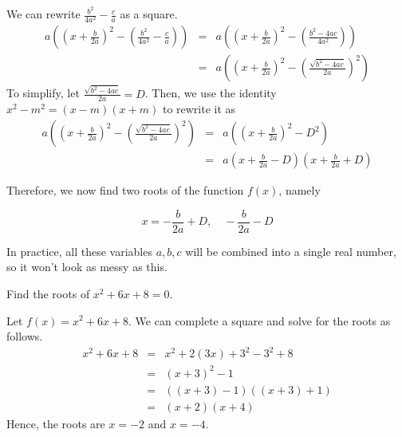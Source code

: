 \begin{frame}
We can rewrite $ \frac{b^2}{4a^2} - \frac{c}{a}$ as a square.
\begin{eqnarray*}
a\left( \left(x + \frac{b}{2a}\right)^2- \left( \frac{b^2}{4a^2} - \frac{c}{a}\right)  \right) &=&  a\left( \left(x + \frac{b}{2a}\right)^2- \left( \frac{b^2-4ac}{4a^2}\right)  \right) \\
&=& a\left( \left(x + \frac{b}{2a}\right)^2- \left( \frac{\sqrt{b^2-4ac}}{2a}\right)^2  \right)
\end{eqnarray*}
To simplify, let $\frac{\sqrt{b^2-4ac}}{2a} = D$. Then, we use the identity $x^2 - m^2 = (x-m)(x+m)$ to rewrite it as
\begin{eqnarray*}
a\left( \left(x + \frac{b}{2a}\right)^2- \left( \frac{\sqrt{b^2-4ac}}{2a}\right)^2  \right) & = & a\left( \left(x + \frac{b}{2a}\right)^2- D^2  \right) \\
&=& a\left( x + \frac{b}{2a} - D\right) \left(x + \frac{b}{2a} + D \right)
\end{eqnarray*}
\end{frame}

\begin{frame}
Therefore, we now find two roots of the function $f(x)$, namely
\begin{block}{}
\[ x = -\frac{b}{2a} + D, \quad  -\frac{b}{2a} - D\]
\end{block}

In practice, all these variables $a,b,c$ will be combined into a single real number, so it won't look as messy as this.
\end{frame}


\begin{frame}[t]
\begin{ex}
Find the roots of $  x^2 +6x+8=0$.
\end{ex}
\begin{sol}
Let $f(x) = x^2 +6x+8$. We can complete a square and solve for the roots as follows.
\begin{eqnarray*}
x^2 + 6x + 8 &=& x^2 + 2(3x) + 3^2 - 3^2 + 8 \\
&=& (x+3)^2 - 1 \\
&=& ((x+3)-1)((x+3)+1) \\
&=& (x+2)(x+4)
\end{eqnarray*}
Hence, the roots are $x = -2$ and $x=-4$.
\end{sol}
\end{frame}


